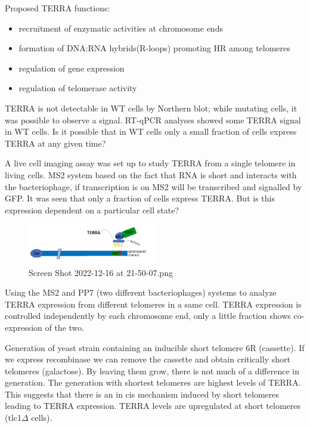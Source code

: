 Proposed TERRA functions:

\begin{itemize}
\tightlist
\item
  recruitment of enzymatic activities at chromosome ends
\item
  formation of DNA:RNA hybrids(R-loops) promoting HR among telomeres
\item
  regulation of gene expression
\item
  regulation of telomerase activity
\end{itemize}

TERRA is not detectable in WT cells by Northern blot; while mutating
cells, it was possible to observe a signal. RT-qPCR analyses showed some
TERRA signal in WT cells. Is it possible that in WT cells only a small
fraction of cells express TERRA at any given time?

A live cell imaging assay was set up to study TERRA from a single
telomere in living cells. MS2 system based on the fact that RNA is short
and interacts with the bacteriophage, if transcription is on MS2 will be
transcribed and signalled by GFP. It was seen that only a fraction of
cells express TERRA. But is this expression dependent on a particular
cell state?

\begin{figure}
\centering
\includegraphics[width=0.5\textwidth]{../_resources/Screen_Shot_2022-12-16_at_21-50-07.png}
\caption{Screen Shot 2022-12-16 at 21-50-07.png}
\end{figure}

Using the MS2 and PP7 (two different bacteriophages) systems to analyze
TERRA expression from different telomeres in a same cell. TERRA
expression is controlled independently by each chromosome end, only a
little fraction shows co-expression of the two.

Generation of yeast strain containing an inducible short telomere 6R
(cassette). If we express recombinase we can remove the cassette and
obtain critically short telomeres (galactose). By leaving them grow,
there is not much of a difference in generation. The generation with
shortest telomeres are highest levels of TERRA. This suggests that there
is an in cis mechanism induced by short telomeres leading to TERRA
expression. TERRA levels are upregulated at short telomeres
(tlc1\(\Delta\) cells).


